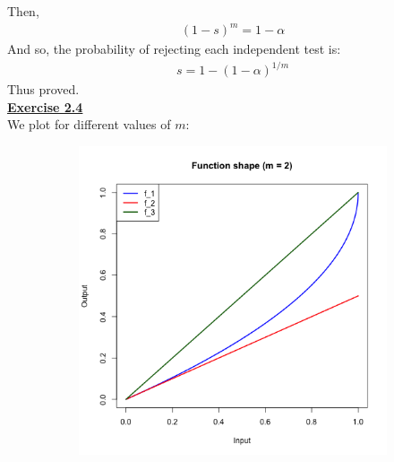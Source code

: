 \documentclass[a4paper, 11pt]{article}
\begin{document}
Then,
\begin{eqnarray}
(1-s)^m = 1 - \alpha \nonumber
\end{eqnarray}
And so, the probability of rejecting each independent test is:
\begin{eqnarray}
s = 1 - (1 - \alpha)^{1/m} \nonumber
\end{eqnarray}
Thus proved.\\
\newline \textbf{\underline{Exercise 2.4}}\\
\newline We plot for different values of $m$:
\begin{figure}[H]
\centering
\begin{subfigure}{.5\textwidth}
  \centering
  \includegraphics[width=1\linewidth]{pic2.png}
\end{subfigure}%
\begin{subfigure}{.5\textwidth}
  \centering

\end{subfigure}
\end{figure}
\end{document}
